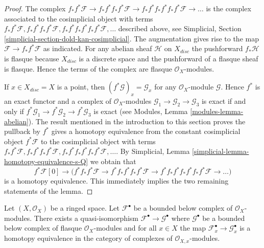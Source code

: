 \begin{proof}
The complex $f_*f^*\mathcal{F} \to  f_*f^*f_*f^*\mathcal{F} \to
f_*f^*f_*f^*f_*f^*\mathcal{F} \to \ldots$ is the complex associated
to the cosimplicial object with terms
$f_*f^*\mathcal{F}, f_*f^*f_*f^*\mathcal{F},
f_*f^*f_*f^*f_*f^*\mathcal{F}, \ldots$ described above, see
Simplicial, Section \ref{simplicial-section-dold-kan-cosimplicial}.
The augmentation gives rise to the map $\mathcal{F} \to f_*f^*\mathcal{F}$
as indicated. For any abelian sheaf $\mathcal{H}$ on $X_{disc}$ the
pushforward $f_*\mathcal{H}$ is flasque because $X_{disc}$
is a discrete space and the pushforward of a flasque sheaf is flasque.
Hence the terms of the complex are flasque $\mathcal{O}_X$-modules.

\medskip\noindent
If $x \in X_{disc} = X$ is a point, then $(f^*\mathcal{G})_x = \mathcal{G}_x$
for any $\mathcal{O}_X$-module $\mathcal{G}$. Hence $f^*$ is an exact functor
and a complex of $\mathcal{O}_X$-modules
$\mathcal{G}_1 \to \mathcal{G}_2 \to \mathcal{G}_3$
is exact if and only if
$f^*\mathcal{G}_1 \to f^*\mathcal{G}_2 \to f^*\mathcal{G}_3$
is exact (see Modules, Lemma \ref{modules-lemma-abelian}).
The result mentioned in the introduction to this section
proves the pullback by $f^*$ gives a homotopy equivalence from
the constant cosimplicial object $f^*\mathcal{F}$ to the
cosimplicial object with terms
$f_*f^*\mathcal{F}, f_*f^*f_*f^*\mathcal{F},
f_*f^*f_*f^*f_*f^*\mathcal{F}, \ldots$.
By Simplicial, Lemma \ref{simplicial-lemma-homotopy-equivalence-s-Q}
we obtain that
$$
f^*\mathcal{F}[0] \to \Big(
f^*f_*f^*\mathcal{F} \to
f^*f_*f^*f_*f^*\mathcal{F} \to
f^*f_*f^*f_*f^*f_*f^*\mathcal{F} \to \ldots
\Big)
$$
is a homotopy equivalence. This immediately implies the two remaining
statements of the lemma.
\end{proof}

\begin{lemma}
\label{lemma-godement-resolution-bounded-below}
Let $(X, \mathcal{O}_X)$ be a ringed space. Let
$\mathcal{F}^\bullet$ be a bounded below complex of
$\mathcal{O}_X$-modules. There exists a quasi-isomorphism
$\mathcal{F}^\bullet \to \mathcal{G}^\bullet$
where $\mathcal{G}^\bullet$ be a bounded below complex of flasque
$\mathcal{O}_X$-modules and for all $x \in X$ the
map $\mathcal{F}^\bullet_x \to \mathcal{G}^\bullet_x$
is a homotopy equivalence in the category of complexes
of $\mathcal{O}_{X, x}$-modules.
\end{lemma}

